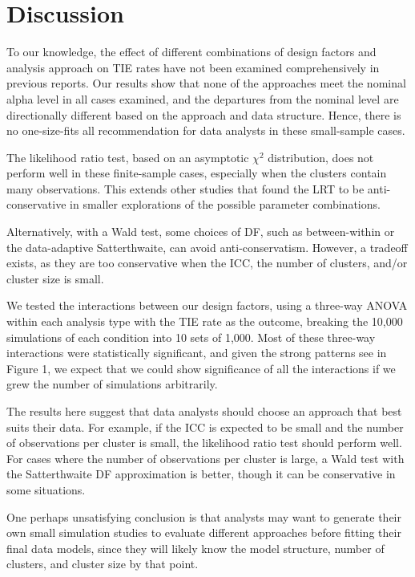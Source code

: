 \documentclass[twocolumn]{bmcart}%
\begin{document}
\section*{Discussion}


To our knowledge, the effect of different combinations of design factors and analysis approach on TIE rates have not been examined comprehensively in previous reports. Our results show that none of the approaches meet the nominal alpha level in all cases examined, and the departures from the nominal level are directionally different based on the approach and data structure. Hence, there is no one-size-fits all recommendation for data analysts in these small-sample cases.

The likelihood ratio test, based on an asymptotic $\chi^2$ distribution, does not perform well in these finite-sample cases, especially when the clusters contain many observations. This extends other studies that found the LRT to be anti-conservative \cite{pinheiro_mixed-effects_2009, halekoh_kenward-roger_2014} in smaller explorations of the possible parameter combinations.

Alternatively, with a Wald test, some choices of DF, such as between-within or the data-adaptive Satterthwaite, can avoid anti-conservatism. However, a tradeoff exists, as they are too conservative when the ICC, the number of clusters, and/or cluster size is small.

We tested the interactions between our design factors, using a three-way ANOVA within each analysis type with the TIE rate as the outcome, breaking the 10,000 simulations of each condition into 10 sets of 1,000. Most of these three-way interactions were statistically significant, and given the strong patterns see in Figure 1, we expect that we could show significance of all the interactions if we grew the number of simulations arbitrarily.

The results here suggest that data analysts should choose an approach that best suits their data. For example, if the ICC is expected to be small and the number of observations per cluster is small, the likelihood ratio test should perform well. For cases where the number of observations per cluster is large, a Wald test with the Satterthwaite DF approximation is better, though it can be conservative in some situations.

One perhaps unsatisfying conclusion is that analysts may want to generate their own small simulation studies to evaluate different approaches before fitting their final data models, since they will likely know the model structure, number of clusters, and cluster size by that point.
\end{document}
